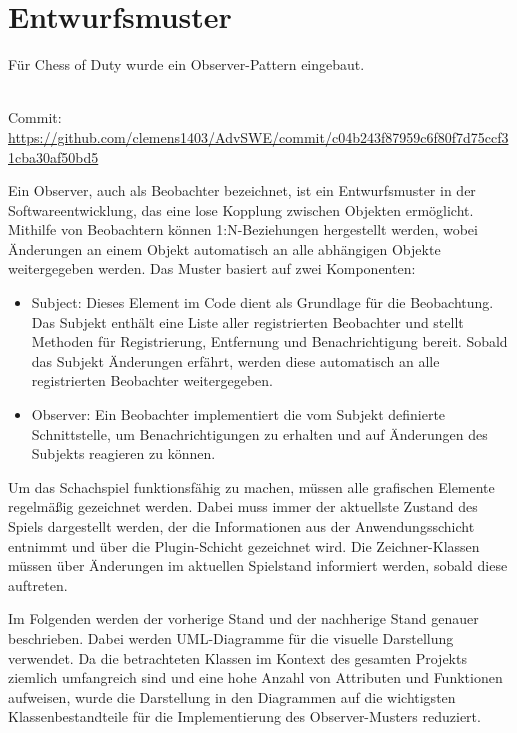 \chapter{Entwurfsmuster}

Für \glqq Chess of Duty\grqq{} wurde ein Observer-Pattern eingebaut.

\begin{balken}
    \tip
    \\
    Commit: \\
    \footnotesize \url{https://github.com/clemens1403/AdvSWE/commit/c04b243f87959c6f80f7d75ccf31cba30af50bd5}
\end{balken}

Ein Observer, auch als Beobachter bezeichnet, ist ein Entwurfsmuster in der Softwareentwicklung, das eine lose Kopplung zwischen Objekten ermöglicht. 
Mithilfe von Beobachtern können 1:N-Beziehungen hergestellt werden, wobei Änderungen an einem Objekt automatisch an alle abhängigen Objekte weitergegeben werden. Das Muster basiert auf zwei Komponenten:

\begin{itemize}
    \item Subject: Dieses Element im Code dient als Grundlage für die Beobachtung. Das Subjekt enthält eine Liste aller registrierten Beobachter und stellt Methoden für Registrierung, Entfernung und Benachrichtigung bereit. Sobald das Subjekt Änderungen erfährt, werden diese automatisch an alle registrierten Beobachter weitergegeben.
    \item Observer: Ein Beobachter implementiert die vom Subjekt definierte Schnittstelle, um Benachrichtigungen zu erhalten und auf Änderungen des Subjekts reagieren zu können.
\end{itemize}

Um das Schachspiel funktionsfähig zu machen, müssen alle grafischen Elemente regelmäßig gezeichnet werden. 
Dabei muss immer der aktuellste Zustand des Spiels dargestellt werden, der die Informationen aus der Anwendungsschicht entnimmt und über die Plugin-Schicht gezeichnet wird. 
Die Zeichner-Klassen müssen über Änderungen im aktuellen Spielstand informiert werden, sobald diese auftreten.

Im Folgenden werden der vorherige Stand und der nachherige Stand genauer beschrieben. 
Dabei werden UML-Diagramme für die visuelle Darstellung verwendet. 
Da die betrachteten Klassen im Kontext des gesamten Projekts ziemlich umfangreich sind und eine hohe Anzahl von Attributen und Funktionen aufweisen, wurde die Darstellung in den Diagrammen auf die wichtigsten Klassenbestandteile für die Implementierung des Observer-Musters reduziert.

